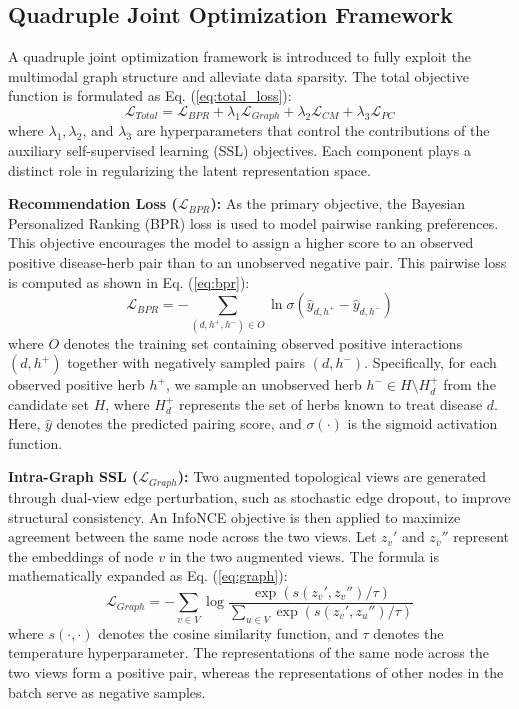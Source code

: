 \documentclass[a4paper,fleqn]{cas-dc}
\begin{document}
\subsection{Quadruple Joint Optimization Framework}

A quadruple joint optimization framework is introduced to fully exploit the multimodal graph structure and alleviate data sparsity. The total objective function is formulated as Eq. (\ref{eq:total_loss}):
\begin{equation}
\label{eq:total_loss}
\mathcal{L}_{Total} = \mathcal{L}_{BPR} + \lambda_1 \mathcal{L}_{Graph} + \lambda_2 \mathcal{L}_{CM} + \lambda_3 \mathcal{L}_{PC}
\end{equation}
where $\lambda_1, \lambda_2$, and $\lambda_3$ are hyperparameters that control the contributions of the auxiliary self-supervised learning (SSL) objectives. Each component plays a distinct role in regularizing the latent representation space.

\textbf{Recommendation Loss ($\mathcal{L}_{BPR}$):} As the primary objective, the Bayesian Personalized Ranking (BPR) \cite{ref51} loss is used to model pairwise ranking preferences. This objective encourages the model to assign a higher score to an observed positive disease-herb pair than to an unobserved negative pair. This pairwise loss is computed as shown in Eq. (\ref{eq:bpr}):
\begin{equation}
\label{eq:bpr}
\mathcal{L}_{BPR} = -\sum_{(d, h^+, h^-) \in O} \ln \sigma(\hat{y}_{d,h^+} - \hat{y}_{d,h^-})
\end{equation}
where $O$ denotes the training set containing observed positive interactions $(d, h^+)$ together with negatively sampled pairs $(d, h^-)$. Specifically, for each observed positive herb $h^+$, we sample an unobserved herb $h^- \in H \setminus H_d^+$ from the candidate set $H$, where $H_d^+$ represents the set of herbs known to treat disease $d$. Here, $\hat{y}$ denotes the predicted pairing score, and $\sigma(\cdot)$ is the sigmoid activation function.

\textbf{Intra-Graph SSL ($\mathcal{L}_{Graph}$):} Two augmented topological views are generated through dual-view edge perturbation, such as stochastic edge dropout, to improve structural consistency. An InfoNCE \cite{ref52} objective is then applied to maximize agreement between the same node across the two views. Let $z_v'$ and $z_v''$ represent the embeddings of node $v$ in the two augmented views. The formula is mathematically expanded as Eq. (\ref{eq:graph}):
\begin{equation}
\label{eq:graph}
\mathcal{L}_{Graph} = -\sum_{v \in V} \log \frac{\exp(s(z_v', z_v'')/\tau)}{\sum_{u \in V} \exp(s(z_v', z_u'')/\tau)}
\end{equation}
where $s(\cdot, \cdot)$ denotes the cosine similarity function, and $\tau$ denotes the temperature hyperparameter. The representations of the same node across the two views form a positive pair, whereas the representations of other nodes in the batch serve as negative samples.
\end{document}
